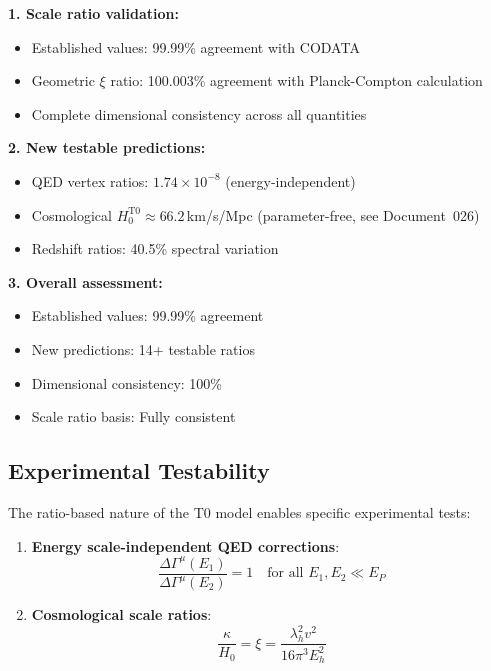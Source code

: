 	\begin{tcolorbox}[colback=green!5!white,colframe=green!75!black,title=Main Results of T0 Verification]
		\textbf{1. Scale ratio validation:}
		\begin{itemize}
			\item Established values: 99.99\% agreement with CODATA
			\item Geometric $\xi$ ratio: 100.003\% agreement with Planck-Compton calculation
			\item Complete dimensional consistency across all quantities
		\end{itemize}
		
		\textbf{2. New testable predictions:}
		\begin{itemize}
			\item QED vertex ratios: $1.74 \times 10^{-8}$ (energy-independent)
			\item Cosmological $H_0^{\text{T0}} \approx 66.2\,$km/s/Mpc (parameter-free, see Document~026)
			\item Redshift ratios: 40.5\% spectral variation
		\end{itemize}
		
		\textbf{3. Overall assessment:}
		\begin{itemize}
			\item Established values: 99.99\% agreement
			\item New predictions: 14+ testable ratios
			\item Dimensional consistency: 100\%
			\item Scale ratio basis: Fully consistent
		\end{itemize}
	\end{tcolorbox}
	
	\subsection{Experimental Testability}
	
	The ratio-based nature of the T0 model enables specific experimental tests:
	
	\begin{enumerate}
		\item \textbf{Energy scale-independent QED corrections}:
		\begin{equation}
			\frac{\Delta\Gamma^{\mu}(E_1)}{\Delta\Gamma^{\mu}(E_2)} = 1 \quad \text{for all } E_1, E_2 \ll E_P
		\end{equation}
		
		\item \textbf{Cosmological scale ratios}:
		\begin{equation}
			\frac{\kappa}{H_0} = \xi = \frac{\lambda_h^2 v^2}{16\pi^3 E_h^2}
		\end{equation}
	\end{enumerate}
	
